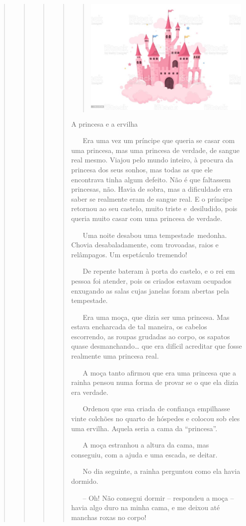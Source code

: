 \begin{quote}
\begin{quote}
\begin{quote}
\begin{quote}
\begin{quote}
\includegraphics[width=3.15101in,height=2.21875in]{media/image34.jpeg}
\end{quote}

A princesa e a ervilha

~ ~ Era uma vez um príncipe que queria se casar com uma princesa, mas
uma princesa de verdade, de sangue real mesmo. Viajou pelo mundo
inteiro, à procura da princesa dos seus sonhos, mas todas as que ele
encontrava tinha algum defeito. Não é que faltassem princesas, não.
Havia de sobra, mas a dificuldade era saber se realmente eram de sangue
real. E o príncipe retornou ao seu castelo, muito triste e~desiludido,
pois queria muito casar com uma princesa de verdade.

~ ~ Uma noite desabou uma tempestade~medonha. Chovia desabaladamente,
com trovoadas, raios e relâmpagos. Um espetáculo tremendo!

~ ~ De repente bateram à porta do castelo, e o rei em pessoa foi
atender, pois os criados estavam ocupados enxugando as salas cujas
janelas foram abertas pela tempestade.

~ ~ Era uma moça, que dizia ser uma princesa. Mas estava encharcada de
tal maneira, os cabelos escorrendo, as roupas grudadas ao corpo, os
sapatos quase desmanchando\ldots{} que era difícil acreditar que fosse
realmente uma princesa real.

~ ~ A moça tanto afirmou que era uma princesa que a rainha pensou numa
forma de provar se o que ela dizia era verdade.

~ ~ Ordenou que sua criada de confiança empilhasse vinte colchões no
quarto de hóspedes e colocou sob eles uma ervilha. Aquela seria a cama
da ``princesa''.

~ ~ A moça estranhou a altura da cama, mas conseguiu, com a ajuda e uma
escada, se deitar.

~ ~ No dia seguinte, a rainha perguntou como ela havia dormido.

~ ~ -- Oh! Não consegui dormir -- respondeu a moça -- havia algo duro na
minha cama, e me deixou até manchas roxas no corpo!


\end{quote}
\end{quote}
\end{quote}
\end{quote}
